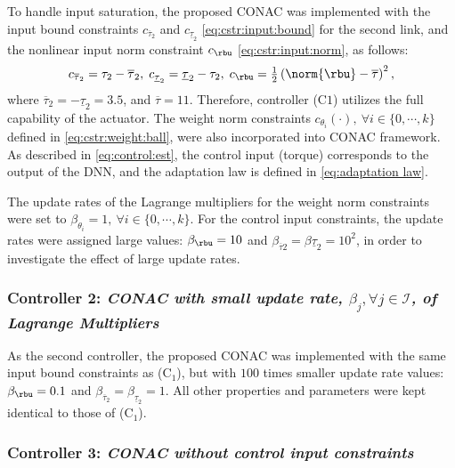 \documentclass[journal]{IEEEtran}
\begin{document}
To handle input saturation, the proposed CONAC was implemented with the input bound constraints $c_{\overline\tau_2}$ and $c_{\underline\tau_2}$ \eqref{eq:cstr:input:bound} for the second link, and the nonlinear input norm constraint $c_{\rbu}$ \eqref{eq:cstr:input:norm}, as follows:
\begin{equation}
    c_{\overline\tau_2}     
    =
    \tau_2-\overline\tau_2
    ,
    \;
    c_{\underline\tau_2} 
    =
    \underline\tau_2-\tau_2
    ,
    \;
    c_{\rbu}
    =
    \tfrac{1}{2}
    \left(
        \norm{\rbu}-\overline\tau
    \right)^2 
    ,
    \label{eq:sim:cstr:CONAC}
\end{equation}
where $\overline\tau_2=-\underline{\tau}_2=3.5$, and $\overline\tau=11$.
Therefore, controller (C$1$) utilizes the full capability of the actuator.
The weight norm constraints $c_{\theta_i}(\cdot),\ \forall i\in\{0,\cdots,k\}$ defined in \eqref{eq:cstr:weight:ball}, were also incorporated into CONAC framework.
As described in \eqref{eq:control:est}, the control input (torque) corresponds to the output of the DNN, and the adaptation law is defined in \eqref{eq:adaptation law}.

The update rates of the Lagrange multipliers for the weight norm constraints were set to $\beta_{\theta_i}=1,\ \forall i\in\{0,\cdots,k\}$.
For the control input constraints, the update rates were assigned large values: $\beta_{\rbu} = 10$ and $\beta_{\overline{\tau}2} = \beta{\underline{\tau}_2} = 10^2$, in order to investigate the effect of large update rates.

\subsubsection*{Controller 2:  \textit{CONAC with small update rate, $\beta_j,\forall j\in\mathcal{I}$, of Lagrange Multipliers}}

As the second controller, the proposed CONAC was implemented with the same input bound constraints as (C$_1$), but with $100$ times smaller update rate values: $\beta_{\rbu}=0.1$ and $\beta_{\overline{\tau}_2}=\beta_{\underline{\tau}_2}=1$.
All other properties and parameters were kept identical to those of (C$_1$).

\subsubsection*{Controller 3:  \textit{CONAC without control input constraints}}
\end{document}
